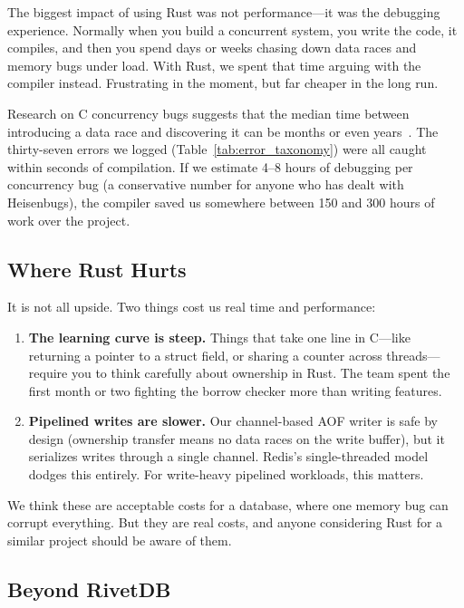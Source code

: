 \documentclass[conference,a4paper]{IEEEtran}
\begin{document}
The biggest impact of using Rust was not performance---it was the debugging experience. Normally when you build a concurrent system, you write the code, it compiles, and then you spend days or weeks chasing down data races and memory bugs under load. With Rust, we spent that time arguing with the compiler instead. Frustrating in the moment, but far cheaper in the long run.

Research on C concurrency bugs suggests that the median time between introducing a data race and discovering it can be months or even years~\cite{lu2008learning}. The thirty-seven errors we logged (Table~\ref{tab:error_taxonomy}) were all caught within seconds of compilation. If we estimate 4--8 hours of debugging per concurrency bug (a conservative number for anyone who has dealt with Heisenbugs), the compiler saved us somewhere between 150 and 300 hours of work over the project.

\subsection{Where Rust Hurts}

It is not all upside. Two things cost us real time and performance:

\begin{enumerate}
    \item \textbf{The learning curve is steep.} Things that take one line in C---like returning a pointer to a struct field, or sharing a counter across threads---require you to think carefully about ownership in Rust. The team spent the first month or two fighting the borrow checker more than writing features.
    \item \textbf{Pipelined writes are slower.} Our channel-based AOF writer is safe by design (ownership transfer means no data races on the write buffer), but it serializes writes through a single channel. Redis's single-threaded model dodges this entirely. For write-heavy pipelined workloads, this matters.
\end{enumerate}

We think these are acceptable costs for a database, where one memory bug can corrupt everything. But they are real costs, and anyone considering Rust for a similar project should be aware of them.

\subsection{Beyond RivetDB}
\end{document}
